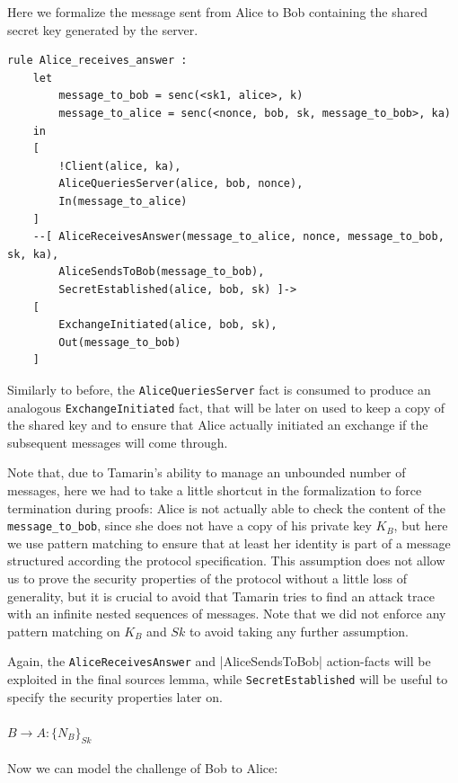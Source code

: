 \documentclass[fleqn,10pt]{SelfArx} %
\begin{document}
Here we formalize the message sent from Alice to Bob containing the shared secret key generated by the server.

\begin{lstlisting}[language=Tamarin]
rule Alice_receives_answer :
    let
        message_to_bob = senc(<sk1, alice>, k)
        message_to_alice = senc(<nonce, bob, sk, message_to_bob>, ka)
    in
    [
        !Client(alice, ka),
        AliceQueriesServer(alice, bob, nonce),
        In(message_to_alice)
    ]
    --[ AliceReceivesAnswer(message_to_alice, nonce, message_to_bob, sk, ka),
        AliceSendsToBob(message_to_bob),
        SecretEstablished(alice, bob, sk) ]->
    [
        ExchangeInitiated(alice, bob, sk),
        Out(message_to_bob)
    ]
\end{lstlisting}

Similarly to before, the \lstinline|AliceQueriesServer| fact is consumed to produce an analogous \lstinline|ExchangeInitiated| fact, that will be later on used to keep a copy of the shared key and to ensure that Alice actually initiated an exchange if the subsequent messages will come through.

Note that, due to Tamarin's ability to manage an unbounded number of messages, here we had to take a little shortcut in the formalization to force termination during proofs: Alice is not actually able to check the content of the \lstinline|message_to_bob|, since she does not have a copy of his private key $K_B$, but here we use pattern matching to ensure that at least her identity is part of a message structured according the protocol specification. This assumption does not allow us to prove the security properties of the protocol without a little loss of generality, but it is crucial to avoid that Tamarin tries to find an attack trace with an infinite nested sequences of messages. Note that we did not enforce any pattern matching on $K_B$ and $Sk$ to avoid taking any further assumption.

Again, the \lstinline|AliceReceivesAnswer| and |AliceSendsToBob| action-facts will be exploited in the final sources lemma, while \lstinline|SecretEstablished| will be useful to specify the security properties later on.

\paragraph{$B \to A: \{N_B\}_{Sk}$}

Now we can model the challenge of Bob to Alice:
\end{document}
